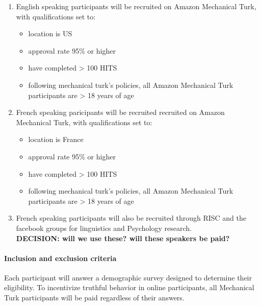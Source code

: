 \documentclass[]{article}
\providecommand{\tightlist}{%
  \setlength{\itemsep}{0pt}\setlength{\parskip}{0pt}}
\let\oldparagraph\paragraph
\renewcommand{\paragraph}[1]{\oldparagraph{#1}\mbox{}}
\begin{document}
\begin{enumerate}
\def\labelenumi{\arabic{enumi})}
\tightlist
\item
  English speaking participants will be recruited on Amazon Mechanical
  Turk, with qualifications set to:

  \begin{itemize}
  \tightlist
  \item
    location is US\\
  \item
    approval rate 95\% or higher\\
  \item
    have completed \textgreater{} 100 HITS\\
  \item
    following mechanical turk's policies, all Amazon Mechanical Turk
    participants are \textgreater{} 18 years of age
  \end{itemize}
\item
  French speaking paricipants will be recruited recruited on Amazon
  Mechanical Turk, with qualifications set to:

  \begin{itemize}
  \tightlist
  \item
    location is France\\
  \item
    approval rate 95\% or higher\\
  \item
    have completed \textgreater{} 100 HITS\\
  \item
    following mechanical turk's policies, all Amazon Mechanical Turk
    participants are \textgreater{} 18 years of age
  \end{itemize}
\item
  French speaking participants will also be recruited through RISC and
  the facebook groups for linguistics and Psychology research.\\
  \textbf{DECISION: will we use these? will these speakers be paid?}
\end{enumerate}

\hypertarget{inclusion-and-exclusion-criteria}{%
\paragraph{Inclusion and exclusion
criteria}\label{inclusion-and-exclusion-criteria}}

Each participant will answer a demographic survey designed to determine
their eligibility. To incentivize truthful behavior in online
participants, all Mechanical Turk participants will be paid regardless
of their answers.
\end{document}
